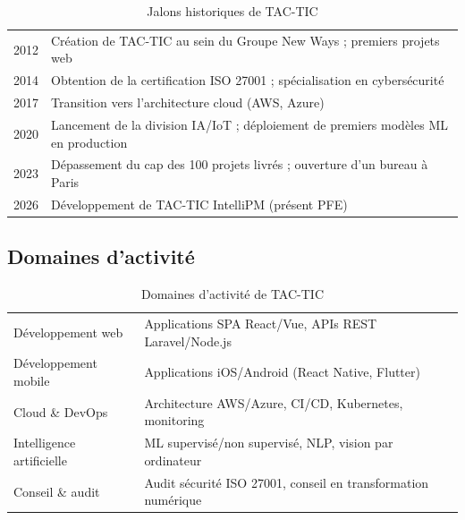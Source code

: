 \begin{table}[H]
  \centering
  \caption{Jalons historiques de TAC-TIC}
  \label{tab:historique_tactic}
  \begin{tabularx}{\textwidth}{C{2cm}X}
    \toprule
     &  \\
    \midrule
    2012 & Création de TAC-TIC au sein du Groupe New Ways ; premiers projets web \\
    2014 & Obtention de la certification ISO 27001 ; spécialisation en cybersécurité \\
    2017 & Transition vers l'architecture cloud (AWS, Azure) \\
    2020 & Lancement de la division IA/IoT ; déploiement de premiers modèles ML en production \\
    2023 & Dépassement du cap des 100 projets livrés ; ouverture d'un bureau à Paris \\
    2026 & Développement de TAC-TIC IntelliPM (présent PFE) \\
    \bottomrule
  \end{tabularx}
\end{table}

\subsection{Domaines d'activité}

\begin{table}[H]
  \centering
  \caption{Domaines d'activité de TAC-TIC}
  \label{tab:domaines_tactic}
  \begin{tabularx}{\textwidth}{L{3.5cm}X}
    \toprule
     &  \\
    \midrule
    Développement web & Applications SPA React/Vue, APIs REST Laravel/Node.js \\
    Développement mobile & Applications iOS/Android (React Native, Flutter) \\
    Cloud \& DevOps & Architecture AWS/Azure, CI/CD, Kubernetes, monitoring \\
    Intelligence artificielle & ML supervisé/non supervisé, NLP, vision par ordinateur \\
    Conseil \& audit & Audit sécurité ISO 27001, conseil en transformation numérique \\
    \bottomrule
  \end{tabularx}
\end{table}

